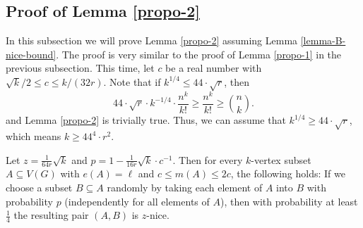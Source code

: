 \subsection{Proof of Lemma \ref{propo-2}}

In this subsection we will prove Lemma \ref{propo-2} assuming Lemma \ref{lemma-B-nice-bound}. The proof is very similar to the proof of Lemma \ref{propo-1} in the previous subsection. This time, let $c$ be a real number with $\sqrt{k}/2\leq c\leq k/(32r)$. Note that if $k^{1/4}\leq 44 \cdot \sqrt{r}$, then
\[44\cdot \sqrt{r}\cdot k^{-1/4}\cdot \frac{n^k}{k!}\geq \frac{n^k}{k!}\geq {n \choose k}.\]
and Lemma \ref{propo-2} is trivially true. Thus, we can assume that $k^{1/4}\geq 44 \cdot \sqrt{r}$, which means $k\geq 44^4 \cdot r^2$.

\begin{lemma}\label{lemma-A-2}Let $z=\frac{1}{64r}\sqrt{k}$ and $p=1-\frac{1}{16r}\sqrt{k}\cdot c^{-1}$. Then for every $k$-vertex subset $A\subseteq V(G)$ with $e(A)=\ell$ and $c\leq m(A)\leq 2c$, the following holds: If we choose a subset $B\subseteq A$ randomly by taking each element of $A$ into $B$ with probability $p$ (independently for all elements of $A$), then with probability at least $\frac{1}{4}$ the resulting pair $(A,B)$ is $z$-nice.
\end{lemma}

